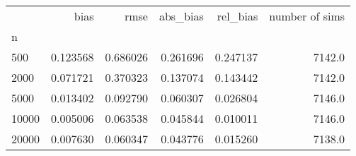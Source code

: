 \begin{tabular}{lrrrrr}
\toprule
{} &      bias &      rmse &  abs_bias &  rel_bias &  number of sims \\
n     &           &           &           &           &                 \\
\midrule
500   &  0.123568 &  0.686026 &  0.261696 &  0.247137 &          7142.0 \\
2000  &  0.071721 &  0.370323 &  0.137074 &  0.143442 &          7142.0 \\
5000  &  0.013402 &  0.092790 &  0.060307 &  0.026804 &          7146.0 \\
10000 &  0.005006 &  0.063538 &  0.045844 &  0.010011 &          7146.0 \\
20000 &  0.007630 &  0.060347 &  0.043776 &  0.015260 &          7138.0 \\
\bottomrule
\end{tabular}
